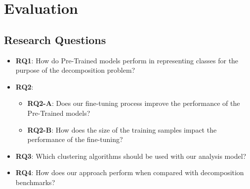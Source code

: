 \section{Evaluation}
\subsection{Research Questions}
\begin{itemize}
    \item \textbf{RQ1}: How do Pre-Trained models perform in representing classes for the purpose of the decomposition problem?
    \item \textbf{RQ2}:
    \begin{itemize}
        \item \textbf{RQ2-A}: Does our fine-tuning process improve the performance of the Pre-Trained models? \item \textbf{RQ2-B}: How does the size of the training samples impact the performance of the fine-tuning?
    \end{itemize}
    \item \textbf{RQ3}: Which clustering algorithms should be used with our analysis model?
    \item \textbf{RQ4}: How does our approach perform when compared with decomposition benchmarks?
\end{itemize}











